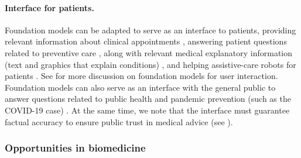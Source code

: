 \paragraph{Interface for patients.}
Foundation models can be adapted to serve as an interface to patients, providing relevant information about clinical appointments \citep{bates2019health}, answering patient questions related to preventive care \citep{demner2020consumer}, along with relevant medical explanatory information (\eg text and graphics that explain conditions) \citep{chaix2019chatbots}, and helping assistive-care robots for patients \citep{jeong2015designing,abdi2018scoping}. See  for more discussion on foundation models for user interaction. Foundation models can also serve as an interface with the general public to answer questions related to public health and pandemic prevention (such as the COVID-19 case) \citep{bharti2020medbot,herriman2020asked}. At the same time, we note that the interface must guarantee factual accuracy to ensure public trust in medical advice \citep{kreps2020model} (see ). 



\subsubsection{Opportunities in biomedicine}
\label{sec:biomed-tasks}

